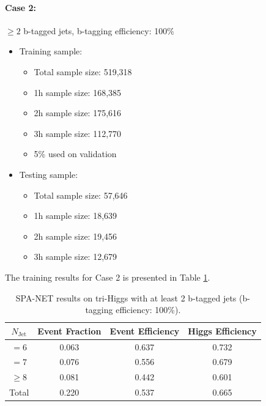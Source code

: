 \documentclass[12pt]{article}
\begin{document}
		\paragraph{Case 2:} $\ge 2$ b-tagged jets, b-tagging efficiency: 100\% 
		\begin{itemize}
			\item Training sample:
			\begin{itemize}
				\item Total sample size: 519,318
				\item 1h sample size: 168,385
				\item 2h sample size: 175,616
				\item 3h sample size: 112,770
				\item 5\% used on validation
			\end{itemize}
			\item Testing sample: 
				\begin{itemize}
					\item Total sample size: 57,646
					\item 1h sample size: 18,639
					\item 2h sample size: 19,456
					\item 3h sample size: 12,679
				\end{itemize}
		\end{itemize}
		The training results for Case 2 is presented in Table \ref{tab:SPANet_triHiggs_2btag_100}.
		\begin{table}[htpb]
			\centering
			\caption{SPA-NET results on tri-Higgs with at least 2 b-tagged jets (b-tagging efficiency: 100\%).}
			\label{tab:SPANet_triHiggs_2btag_100}
			\begin{tabular}{c|c|cc}
				$N_\text{Jet}$ & Event Fraction & Event Efficiency & Higgs Efficiency \\
				\hline
				$=6$	  &   0.063             &    0.637              &    0.732             \\
				$=7$	  &   0.076             &    0.556              &    0.679             \\
				$\ge 8$	  &   0.081             &    0.442              &    0.601             \\
				Total	  &   0.220             &    0.537              &    0.665             \\
			\end{tabular}
		\end{table}
\end{document}

